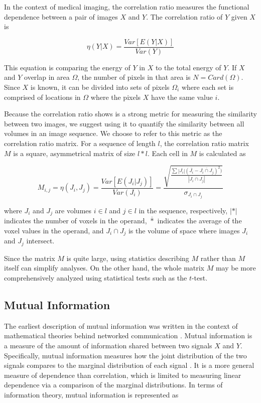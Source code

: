 In the context of medical imaging, the correlation ratio measures the functional dependence between a pair of images $X$ and $Y$. The correlation ratio of $Y$ given $X$ is

\begin{equation}
\eta(Y|X) = \frac{Var[E(Y|X)]}{Var(Y)}
\end{equation}

This equation is comparing the energy of $Y$ in $X$ to the total energy of $Y$. If $X$ and $Y$ overlap in area $\Omega$, the number of pixels in that area is $N = Card(\Omega)$. Since $X$ is known, it can be divided into sets of pixels $\Omega_i$ where each set is comprised of locations in $\Omega$ where the pixels $X$ have the same value $i$. 

Because the correlation ratio shows is a strong metric for measuring the similarity between two images, we suggest using it to quantify the similarity between all volumes in an image sequence. We choose to refer to this metric as the correlation ratio matrix. For a sequence of length $l$, the correlation ratio matrix $M$ is a square, asymmetrical matrix of size $l*l$. Each cell in $M$ is calculated as

\begin{equation}
M_{i,j} = \eta(J_i, J_j) = \frac{Var[E(J_i|J_j)]}{Var(J_i)} =  \frac{\sqrt{\frac{\sum |J_i|(\overline{J_i} - \overline{J_i \cap J_j})^2)}{|J_i \cap J_j|}}}{\sigma_{J_i \cap J_j}}
\end{equation}

\noindent where $J_i$ and $J_j$ are volumes $i \in l$ and $j \in l$ in the sequence, respectively, $|*|$ indicates the number of voxels in the operand, $\overline{*}$ indicates the average of the voxel values in the operand, and $J_i \cap J_j$ is the volume of space where images $J_i$ and $J_j$ intersect. %

Since the matrix $M$ is quite large, using statistics describing $M$ rather than $M$ itself can simplify analyses. On the other hand, the whole matrix $M$ may be more comprehensively analyzed using statistical tests such as the $t$-test.

\subsection{Mutual Information}

The earliest description of mutual information was written in the context of mathematical theories behind networked communication \cite{Shannon1948}. Mutual information is a measure of the amount of information shared between two signals $X$ and $Y$. Specifically, mutual information measures how the joint distribution of the two signals compares to the marginal distribution of each signal \cite{Li1990}. It is a more general measure of dependence than correlation, which is limited to measuring linear dependence via a comparison of the marginal distributions. In terms of information theory, mutual information is represented as

